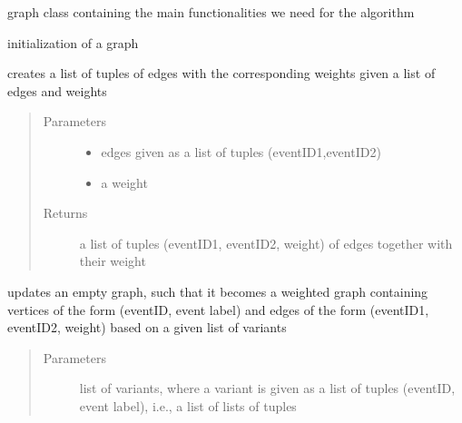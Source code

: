 \documentclass[letterpaper,10pt,english]{sphinxmanual}
\begin{document}
\begin{fulllineitems}
\label{\detokenize{graph:graph.graphTool.graphTool}}
graph class containing the main functionalities we need for the algorithm

initialization of a graph

\begin{fulllineitems}
\label{\detokenize{graph:graph.graphTool.graphTool.createEdgeList}}
creates a list of tuples of edges with the corresponding weights given a list of edges and weights
\begin{quote}\begin{description}
\item[{Parameters}] \leavevmode\begin{itemize}
\item {} 
 \textendash{} edges given as a list of tuples (eventID1,eventID2)

\item {} 
 \textendash{} a weight

\end{itemize}

\item[{Returns}] \leavevmode
a list of tuples (eventID1, eventID2, weight) of edges together with their weight

\end{description}\end{quote}

\end{fulllineitems}


\begin{fulllineitems}
\label{\detokenize{graph:graph.graphTool.graphTool.createGraphFromVariants}}
updates an empty graph, such that it becomes a weighted graph containing vertices of the form (eventID, event label) and edges of the form (eventID1, eventID2, weight) based on a given list of variants
\begin{quote}\begin{description}
\item[{Parameters}] \leavevmode
{} \textendash{} list of variants, where a variant is given as a list of tuples (eventID, event label), i.e., a list of lists of tuples


\end{description}
\end{quote}
\end{fulllineitems}
\end{fulllineitems}
\end{document}

